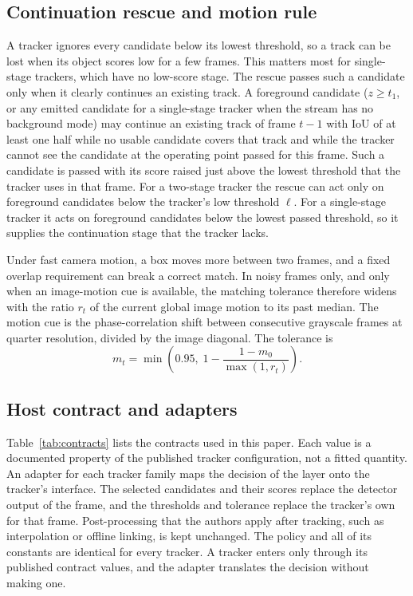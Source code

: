 \documentclass[pdflatex,sn-mathphys-num,iicol]{sn-jnl}
\begin{document}
\subsection{Continuation rescue and motion rule}\label{sec:rescue}
A tracker ignores every candidate below its lowest threshold, so a track can
be lost when its object scores low for a few frames. This matters most for
single-stage trackers, which have no low-score stage. The rescue passes such
a candidate only when it clearly continues an existing track. A foreground
candidate ($z\ge t_1$, or any emitted candidate for a
single-stage tracker when the stream has no background mode) may continue an
existing track of frame $t-1$ with IoU of at least one half while no usable candidate covers that
track and while the tracker cannot see the candidate at the operating point
passed for this frame. Such a candidate is passed with its score raised just
above the lowest threshold that the tracker uses in that frame. For a
two-stage tracker the rescue can act only on foreground candidates below the
tracker's low threshold $\ell$. For a single-stage tracker it acts on
foreground candidates below the lowest passed threshold, so it supplies the
continuation stage that the tracker lacks.

Under fast camera motion, a box moves more between two frames, and a fixed
overlap requirement can break a correct match. In noisy frames only, and only
when an image-motion cue is available, the matching tolerance therefore widens with the ratio $r_t$ of the current global image
motion to its past median. The motion cue is the phase-correlation shift
\cite{reddy1996phasecorr} between consecutive grayscale frames at quarter
resolution, divided by the image diagonal. The tolerance is
\begin{equation}
m_t=\min\!\left(0.95,\;1-\frac{1-m_0}{\max(1,r_t)}\right).
\label{eq:motion}
\end{equation}

\subsection{Host contract and adapters}\label{sec:contract}
Table~\ref{tab:contracts} lists the contracts used in this paper. Each value
is a documented property of the published tracker configuration, not a fitted
quantity. An adapter for each tracker family maps the decision of the layer
onto the tracker's interface. The selected candidates and their scores replace
the detector output of the frame, and the thresholds and tolerance replace the
tracker's own for that frame. Post-processing that the authors apply after tracking, such as interpolation
or offline linking, is kept unchanged. The policy and all of its constants are
identical for every tracker. A tracker enters only through its published
contract values, and the adapter translates the decision without making one.
\end{document}
